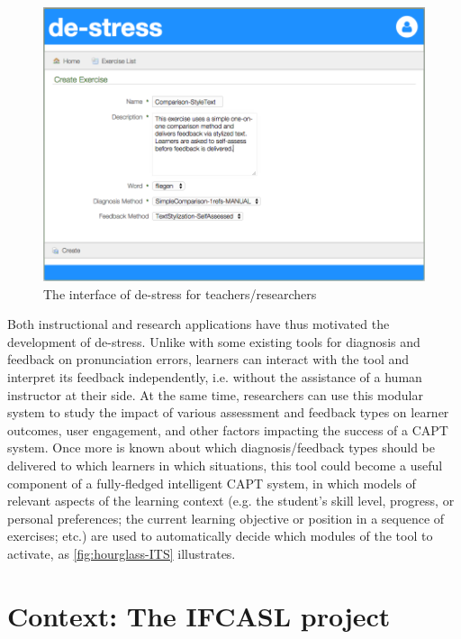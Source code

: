 	\begin{figure}[htbp]
		\centering
		\includegraphics[width=\textwidth]{img/screenshots/TeacherInterface-userIcon}
		\caption{The interface of de-stress for teachers/researchers}
		\label{fig:interface:teacher}
	\end{figure}

Both instructional and research applications have thus motivated the development of de-stress.
Unlike with some existing tools for diagnosis and feedback on pronunciation errors, learners can interact with the tool and interpret its feedback independently, i.e. without the assistance of a human instructor at their side.
At the same time, researchers can use this modular system to study the impact of various assessment and feedback types on learner outcomes, user engagement, and other factors impacting the success of a CAPT system. 
%
Once more is known about which diagnosis/feedback types should be delivered to which learners in which situations, this tool could become a useful component of a fully-fledged intelligent CAPT system, in which 
models of relevant aspects of the learning context (e.g. the student's skill level, progress, or personal preferences; the current learning objective or position in a sequence of exercises; etc.)
are used to automatically decide which modules of the tool to activate, as \cref{fig:hourglass-ITS} illustrates.




\section{Context: The IFCASL project}
\label{sec:intro:ifcasl}

